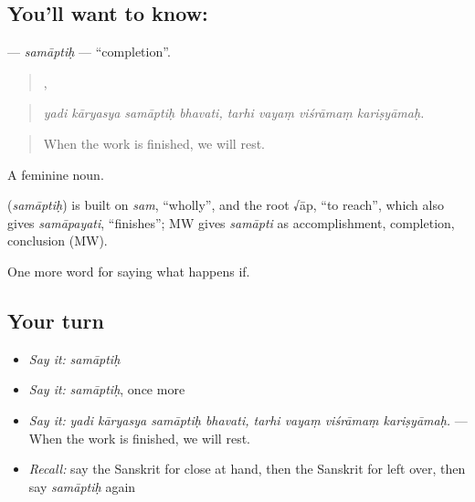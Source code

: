 \subsection*{You'll want to know: }
\textbf{} — \emph{samāptiḥ} — \textquotedblleft{}completion\textquotedblright{}.

\begin{quote}
   ,    
\end{quote}

\begin{quote}
\emph{yadi kāryasya samāptiḥ bhavati, tarhi vayaṃ viśrāmaṃ kariṣyāmaḥ.}
\end{quote}

\begin{quote}
When the work is finished, we will rest.
\end{quote}

A feminine noun.

\begin{cousinweb}
\textbf{} (\emph{samāptiḥ}) is built on \emph{sam}, \textquotedblleft{}wholly\textquotedblright{}, and the root √āp, \textquotedblleft{}to reach\textquotedblright{}, which also gives \emph{samāpayati}, \textquotedblleft{}finishes\textquotedblright{}; MW gives \emph{samāpti} as accomplishment, completion, conclusion (MW).
\end{cousinweb}

\begin{grammarlens}[title={What you've built}]
One more word for saying what happens if.
\end{grammarlens}

\subsection*{Your turn}
\begin{itemize}
\raggedright
  \item \emph{Say it:} \emph{samāptiḥ}
  \item \emph{Say it:} \emph{samāptiḥ}, once more
  \item \emph{Say it:} \emph{yadi kāryasya samāptiḥ bhavati, tarhi vayaṃ viśrāmaṃ kariṣyāmaḥ.} — When the work is finished, we will rest.
  \item \emph{Recall:} say the Sanskrit for close at hand, then the Sanskrit for left over, then say \emph{samāptiḥ} again
\end{itemize}

